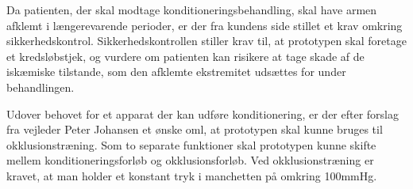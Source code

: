 Da patienten, der skal modtage konditioneringsbehandling, skal have armen afklemt i længerevarende perioder, er der fra kundens side stillet et krav omkring sikkerhedskontrol. Sikkerhedskontrollen stiller krav til, at prototypen skal foretage et kredsløbstjek, og vurdere om patienten kan risikere at tage skade af de iskæmiske tilstande, som den afklemte ekstremitet udsættes for under behandlingen.

Udover behovet for et apparat der kan udføre konditionering, er der efter forslag fra vejleder Peter Johansen et ønske oml, at prototypen skal kunne bruges til okklusionstræning. Som to separate funktioner skal prototypen kunne skifte mellem konditioneringsforløb og okklusionsforløb. Ved okklusionstræning er kravet, at man holder et konstant tryk i manchetten på omkring 100mmHg. 


